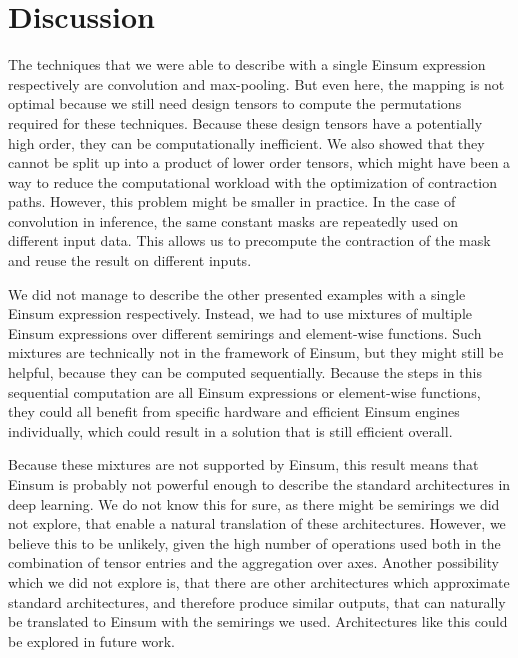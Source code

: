 \section{Discussion}

The techniques that we were able to describe with a single Einsum expression respectively are convolution and max-pooling.
But even here, the mapping is not optimal because we still need design tensors to compute the permutations required for these techniques.
Because these design tensors have a potentially high order, they can be computationally inefficient.
We also showed that they cannot be split up into a product of lower order tensors, which might have been a way to reduce the computational workload with the optimization of contraction paths.
However, this problem might be smaller in practice.
In the case of convolution in inference, the same constant masks are repeatedly used on different input data.
This allows us to precompute the contraction of the mask and reuse the result on different inputs.

We did not manage to describe the other presented examples with a single Einsum expression respectively.
Instead, we had to use mixtures of multiple Einsum expressions over different semirings and element-wise functions.
Such mixtures are technically not in the framework of Einsum, but they might still be helpful,
because they can be computed sequentially.
Because the steps in this sequential computation are all Einsum expressions or element-wise functions,
they could all benefit from specific hardware and efficient Einsum engines individually,
which could result in a solution that is still efficient overall.

Because these mixtures are not supported by Einsum, this result means that Einsum is probably not powerful enough to describe the standard architectures in deep learning.
We do not know this for sure, as there might be semirings we did not explore, that enable a natural translation of these architectures.
However, we believe this to be unlikely, given the high number of operations used both in the combination of tensor entries and the aggregation over axes.
Another possibility which we did not explore is, that there are other architectures which approximate standard architectures, and therefore produce similar outputs, that can naturally be translated to Einsum with the semirings we used.
Architectures like this could be explored in future work.
